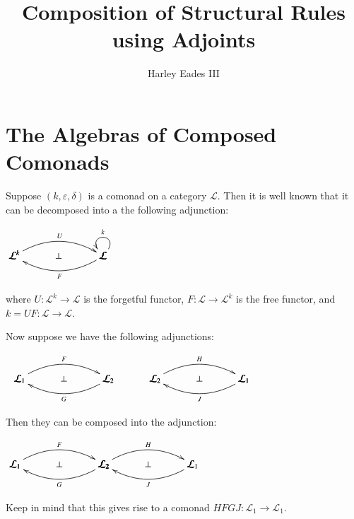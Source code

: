 \documentclass{article}
\date{}
\title{Composition of Structural Rules using Adjoints}
\author{Harley Eades III}
\let\mto\to
\let\to\relax
\newcommand{\to}{\rightarrow}
\newcommand{\cat}[1]{\mathcal{#1}}
\begin{document}
\maketitle 

\section{The Algebras of Composed Comonads}
\label{sec:the_algebras_of_composed_comonads}
Suppose $(k,\varepsilon,\delta)$ is a comonad on a category $\cat{L}$.
Then it is well known that it can be decomposed into a the following
adjunction:
\begin{center}
  \begin{math}
    \bfig
    \Loop(900,0)\cat{L}(ur,ul)_k
    \morphism(0,0)|a|/{@{>}@/^1.5em/}/<900,0>[\cat{L}^k`\cat{L};U]
    \morphism(0,0)|b|/{@{<-}@/_1.5em/}/<900,0>[\cat{L}^k`\cat{L};F]
    \place(450,0)[\perp]
    \efig
  \end{math}
\end{center}
where $U : \cat{L}^k \mto \cat{L}$ is the forgetful functor, $F :
\cat{L} \mto \cat{L}^k$ is the free functor, and $k = UF : \cat{L}
\mto \cat{L}$.

Now suppose we have the following adjunctions:
\begin{center}
  \begin{math}
    \begin{array}{lll}
      \bfig
      \morphism(0,0)|a|/{@{>}@/^1.5em/}/<900,0>[\cat{L}_1`\cat{L}_2;F]
      \morphism(0,0)|b|/{@{<-}@/_1.5em/}/<900,0>[\cat{L}_1`\cat{L}_2;G]
      \place(450,0)[\perp]
      \efig
      & \quad &
      \bfig
      \morphism(0,0)|a|/{@{>}@/^1.5em/}/<900,0>[\cat{L}_2`\cat{L}_1;H]
      \morphism(0,0)|b|/{@{<-}@/_1.5em/}/<900,0>[\cat{L}_2`\cat{L}_1;J]
      \place(450,0)[\perp]
      \efig
    \end{array}
  \end{math}
\end{center}
Then they can be composed into the adjunction:
\begin{center}
  \begin{math}
      \bfig
      \morphism(0,0)|a|/{@{>}@/^1.5em/}/<900,0>[\cat{L}_1`\cat{L}_2;F]
      \morphism(0,0)|b|/{@{<-}@/_1.5em/}/<900,0>[\cat{L}_1`\cat{L}_2;G]
      \place(450,0)[\perp]

      \morphism(900,0)|a|/{@{>}@/^1.5em/}/<900,0>[\cat{L}_2`\cat{L}_1;H]
      \morphism(900,0)|b|/{@{<-}@/_1.5em/}/<900,0>[\cat{L}_2`\cat{L}_1;J]
      \place(1350,0)[\perp]
      \efig
  \end{math}
\end{center}
Keep in mind that this gives rise to a comonad $HFGJ : \cat{L}_1 \mto
\cat{L}_1$.
\end{document}
